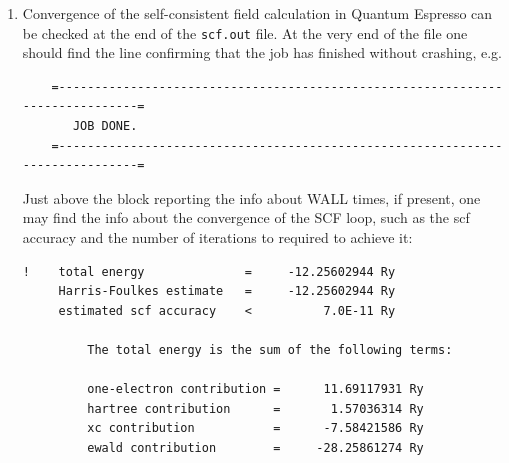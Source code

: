 \begin{enumerate}
	\item Convergence of the self-consistent field calculation in Quantum Espresso can be checked at the end of the {\tt scf.out} file. At the very end of the file one should find the line confirming that the job has finished without crashing, e.g.
  \begin{tcolorbox}[sharp corners,boxrule=0.5pt]
  {\small
	\begin{verbatim}
	=------------------------------------------------------------------------------=
	   JOB DONE.
	=------------------------------------------------------------------------------=
	\end{verbatim}
	}
  \end{tcolorbox}
  Just above the block reporting the info about WALL times, if present, one may find the info about the convergence of the SCF loop, such as the scf accuracy and the number of iterations to required to achieve it:
\begin{tcolorbox}[sharp corners,boxrule=0.5pt]
{\small
	\begin{verbatim}
!    total energy              =     -12.25602944 Ry
     Harris-Foulkes estimate   =     -12.25602944 Ry
     estimated scf accuracy    <          7.0E-11 Ry

         The total energy is the sum of the following terms:

         one-electron contribution =      11.69117931 Ry
         hartree contribution      =       1.57036314 Ry
         xc contribution           =      -7.58421586 Ry
         ewald contribution        =     -28.25861274 Ry


\end{verbatim}}
\end{tcolorbox}
\end{enumerate}
